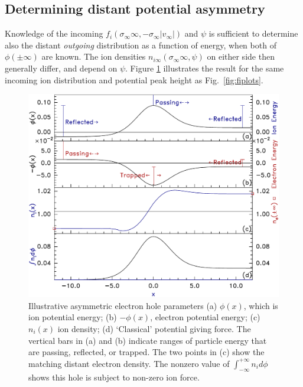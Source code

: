 \documentclass[12pt]{article}
\begin{document}
\subsection{Determining distant potential asymmetry}
\label{phisymmetry}
Knowledge of the incoming
$f_{i}(\sigma_\infty\infty,-\sigma_\infty|v_\infty|)$ and $\psi$ is
sufficient to determine also the distant \emph{outgoing} distribution
as a function of energy, when both of $\phi(\pm\infty)$ are known.
The ion densities $n_{i\infty}(\sigma_{\infty}\infty,\psi)$ on either
side then generally differ, and depend on $\psi$. Figure
\ref{fig:explot} illustrates the result for the same incoming ion
distribution and potential peak height as Fig.\ \ref{fig:fiplots}.
\begin{figure}[htp]
  \centering
  \includegraphics[width=0.6\hsize]{explot}
  \caption{Illustrative asymmetric electron hole parameters (a)
    $\phi(x)$, which is ion potential energy; (b)
    $-\phi(x)$, electron potential energy; (c)
    $n_i(x)$ ion density; (d) `Classical' potential giving force.
  The vertical bars in (a) and (b) indicate ranges of particle energy
  that are passing, reflected, or trapped. The two points in (c) show
  the matching distant electron density. The nonzero value of
  $\int_{-\infty}^{+\infty} n_id\phi$ shows this hole is subject to
  non-zero ion force.}
  \label{fig:explot}
\end{figure}
\end{document}
